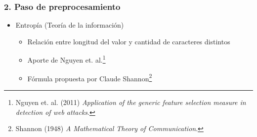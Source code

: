 \begin{frame}[t]
    \frametitle{2. Paso de preprocesamiento}

    \begin{itemize}
        \item
        Entropía (Teoría de la información)

        \begin{itemize}
            \item
            Relación entre longitud del valor y cantidad de caracteres
            distintos

            \item
            Aporte de Nguyen et. al.\footnote{
                Nguyen et. al. (2011) \textit{Application of the generic
                feature selection measure in detection of web attacks}.}

            \item
            Fórmula propuesta por Claude Shannon\footnote{
                Shannon (1948) \textit{A Mathematical Theory of Communication}.}
        \end{itemize}
    \end{itemize}

\end{frame}
